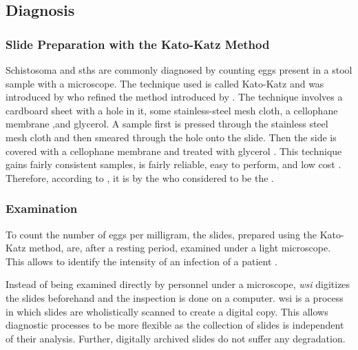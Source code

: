\subsection{Diagnosis}
\label{sec:Foundations:NTDs:Diagnosis}


\subsubsection{Slide Preparation with the Kato-Katz Method}
\label{sec:Foundations:NTDs:Diagnosis:Preparation}

Schistosoma and \acp{sth} are commonly diagnosed by counting eggs present in a stool sample with a microscope. The technique used is called Kato-Katz \cite{nelwan2019schistosomiasis} and was introduced by \textcite{katz1972simple} who refined the method introduced by \citeauthor{kato1954comparative} \cite{kato1954comparative,kato1960correct}. The technique involves a cardboard sheet with a hole in it, some stainless-steel mesh cloth, a cellophane membrane ,and glycerol. A sample first is pressed through the stainless steel mesh cloth and then smeared through the hole onto the slide. Then the side is covered with a cellophane membrane and treated with glycerol \cite{mbongngwese2020diagnostic}. This technique gains fairly consistent samples, is fairly reliable, easy to perform, and low cost \cite{katz1972simple}. Therefore, according to \textcite{mbongngwese2020diagnostic}, it is by the \ac{who} considered to be the .

\subsubsection{Examination}
\label{sec:Foundations:NTDs:Diagnosis:Examination}

To count the number of eggs per milligram, the slides, prepared using the Kato-Katz method, are, after a resting period, examined under a light microscope. This allows to identify the intensity of an infection of a patient \cite{feasey2010neglected}.

Instead of being examined directly by personnel under a microscope, \emph{\acf{wsi}} digitizes the slides beforehand and the inspection is done on a computer. \Ac{wsi} \cite{ghaznavi2013digital, hanna2019whole, el-gabry2014wholeslide} is a process in which slides are wholistically scanned to create a digital copy. This allows diagnostic processes to be more flexible as the collection of slides is independent of their analysis. Further, digitally archived slides do not suffer any degradation. 

